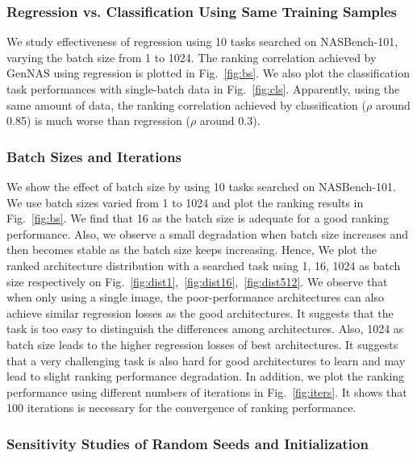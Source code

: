\documentclass{article}
\begin{document}
\begin{figure}[t]
        \label{fig:bs&iters}
        \vspace{-8pt}
\end{figure}

\subsubsection{Regression vs. Classification Using Same Training Samples}
We study effectiveness of regression using 10 tasks searched on NASBench-101, varying the batch size from 1 to 1024. The ranking correlation achieved by GenNAS using regression is plotted in Fig.~\ref{fig:bs}.
We also plot the classification task performances with single-batch data in Fig.~\ref{fig:cls}.
Apparently, using the same amount of data, the ranking correlation achieved by classification ($\rho$ around 0.85) is much worse than regression ($\rho$ around 0.3). 


\subsubsection{Batch Sizes and Iterations}

We show the effect of batch size by using 10 tasks searched on NASBench-101. We use batch sizes varied from 1 to 1024 and plot the ranking results in Fig.~\ref{fig:bs}. We find that 16 as the batch size is adequate for a good ranking performance. Also, we observe a small degradation when batch size increases and then becomes stable as the batch size keeps increasing. Hence, We plot the ranked architecture distribution with a searched task using 1, 16, 1024 as batch size respectively on Fig.~\ref{fig:dist1},~\ref{fig:dist16},~\ref{fig:dist512}. We observe that when only using a single image, the poor-performance architectures can also achieve similar regression losses as the good architectures. It suggests that the task is too easy to distinguish the differences among architectures. Also, 1024 as batch size leads to the higher regression losses of best architectures. It suggests that a very challenging task is also hard for good architectures to learn and may lead to slight ranking performance degradation. In addition, we plot the ranking performance using different numbers of iterations in Fig.~\ref{fig:iters}. It shows that 100 iterations is necessary for the convergence of ranking performance. 


\subsubsection{Sensitivity Studies of Random Seeds and Initialization}
\end{document}
